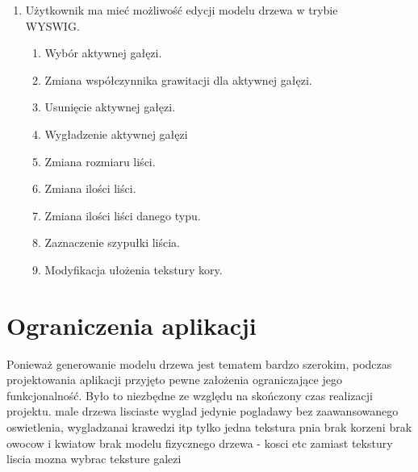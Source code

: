 \begin{enumerate}
\item Użytkownik ma mieć możliwość edycji modelu drzewa w trybie \\WYSWIG.
\begin{enumerate}
\item Wybór aktywnej gałęzi.
\item Zmiana współczynnika grawitacji dla aktywnej gałęzi.
\item Usunięcie aktywnej gałęzi.
\item Wygładzenie aktywnej gałęzi
\item Zmiana rozmiaru liści.
\item Zmiana ilości liści.
\item Zmiana ilości liści danego typu.
\item Zaznaczenie szypułki liścia.
\item Modyfikacja ułożenia tekstury kory.
\end{enumerate}
\end{enumerate}

\section{Ograniczenia aplikacji}
Ponieważ generowanie modelu drzewa jest tematem bardzo szerokim, podczas projektowania
aplikacji przyjęto pewne założenia ograniczające jego funkcjonalność. Było to niezbędne ze
względu na skończony czas realizacji projektu.
male drzewa lisciaste
wyglad jedynie pogladawy bez zaawansowanego oswietlenia, wygladzanai krawedzi itp
tylko jedna tekstura pnia
brak korzeni
brak owocow i kwiatow
brak modelu fizycznego drzewa - kosci etc
zamiast tekstury liscia mozna wybrac teksture galezi
